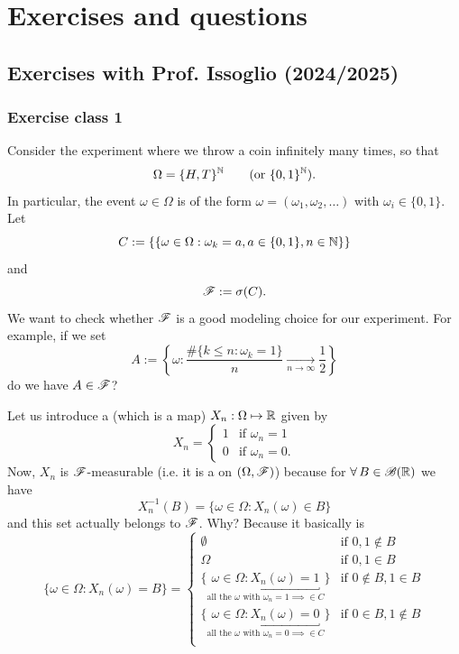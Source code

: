 \documentclass{report}
\begin{document}
\chapter{Exercises and questions}
\section{Exercises with Prof. Issoglio (2024/2025)}
\subsection{Exercise class 1}
\begin{exercise}
	Consider the experiment where we throw a coin infinitely many times, so that 
	\begin{equation*}
		\Omega=\{H,T\}^{\mathbb{N}} \qquad\text{(or $\{0,1\}^{\mathbb{N}}$)}.
	\end{equation*}
	In particular, the event $\omega\in\Omega$ is of the form $\omega=(\omega_1,\omega_2,\ldots)$ with $\omega_i\in\{0,1\}$. Let 
	\begin{equation*}
		C:=\left\{\left\{\omega\in\Omega:\omega_k=a,a\in\{0,1\},n\in\mathbb{N}\right\}\right\}
	\end{equation*}
	and 
	\begin{equation*}
		\mathscr{F}:=\sigma(C).
	\end{equation*}
	We want to check whether $\mathscr{F}$ is a good modeling choice for our experiment. For example, if we set
	\begin{equation*}
		A:=\left\{\omega:\frac{\#\{k\leq n:\omega_k=1\}}{n}\xrightarrow[n\to\infty]{}\frac{1}{2}\right\}
	\end{equation*}
	do we have $A\in\mathscr{F}$?
\end{exercise}
Let us introduce a \rv{} (which is a map) $X_n:\Omega\mapsto\mathbb{R}$ given by 
\begin{equation*}
	X_n=\begin{cases}
		1 &\text{if }\omega_n=1\\
		0&\text{if }\omega_n=0.
	\end{cases}
\end{equation*}
Now, $X_n$ is $\mathscr{F}$-measurable (i.e. it is a \rv{} on $(\Omega,\mathscr{F})$) because for $\forall\, B\in\mathscr{B}(\mathbb{R})$ we have
\begin{equation*}
	X^{-1}_{n}(B)=\{\omega\in\Omega:X_n(\omega)\in B\}
\end{equation*}
and this set actually belongs to $\mathscr{F}$. Why? Because it basically is
\begin{equation*}
	\{\omega\in\Omega:X_n(\omega)=B\}=\begin{cases}
		\emptyset&\text{if }0,1\not\in B\\
		\Omega&\text{if }0,1\in B\\
		\{\underbracket{\omega\in\Omega:X_n(\omega)=1}_{{\text{all the $\omega$ with $\omega_n=1$}\implies\in C}}\}&\text{if }0\not\in B,1\in B\\
		\{\underbracket{\omega\in\Omega:X_n(\omega)=0}_{{\text{all the $\omega$ with $\omega_n=0$}\implies\in C}}\}&\text{if }0\in B,1\not\in B\\
	\end{cases}
\end{equation*}
\end{document}
